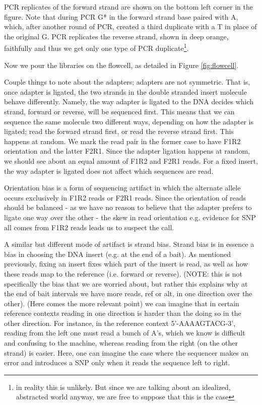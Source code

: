 \documentclass[a4paper]{article}
\begin{document}
PCR replicates of the forward strand are shown on the bottom left corner in the figure. Note that during PCR G* in the forward strand base paired with A, which, after another round of PCR, created a third duplicate with a T in place of the original G. PCR replicates the reverse strand, shown in deep orange, faithfully and thus we get only one type of PCR duplicate\footnote{in reality this is unlikely. But since we are talking about an idealized, abstracted world anyway, we are free to suppose that this is the case}. 

Now we pour the libraries on the flowcell, as detailed in Figure \ref{fig:flowcell}. 


 

Couple things to note about the adapters; adapters are not symmetric. That is, once adapter is ligated, the two strands in the double stranded insert molecule behave differently. Namely, the way adapter is ligated to the DNA decides which strand, forward or reverse, will be sequenced first. This means that we can sequence the same molecule two different ways, depending on how the adapter is ligated; read the forward strand first, or read the reverse strand first. This happens at random. We mark the read pair in the former case to have F1R2 orientation and the latter F2R1. Since the adapter ligation happens at random, we should see about an equal amount of F1R2 and F2R1 reads. For a fixed insert, the way adapter is ligated does not affect which sequences are read. 

Orientation bias is a form of sequencing artifact in which the alternate allele occurs exclusively in F1R2 reads or F2R1 reads. Since the orientation of reads should be balanced - as we have no reason to believe that the adapter prefers to ligate one way over the other - the skew in read orientation e.g. evidence for SNP all comes from F1R2 reads leads us to suspect the call.

A similar but different mode of artifact is strand bias. Strand bias is in essence a bias in choosing the DNA insert (e.g. at the end of a bait). As mentioned previously, fixing an insert fixes which part of the insert is read, as well as how these reads map to the reference (i.e. forward or reverse). (NOTE: this is not specifically the bias that we are worried about, but rather this explains why at the end of bait intervals we have more reads, ref or alt, in one direction over the other). (Here comes the more relevant point) we can imagine that in certain reference contexts reading in one direction is harder than the doing so in the other direction. For instance, in the reference context 5'-AAAAGTACG-3', reading from the left one must read a bunch of A's, which we know is difficult and confusing to the machine, whereas reading from the right (on the other strand) is easier. Here, one can imagine the case where the sequencer makes an error and introduces a SNP only when it reads the sequence left to right. 
\end{document}
